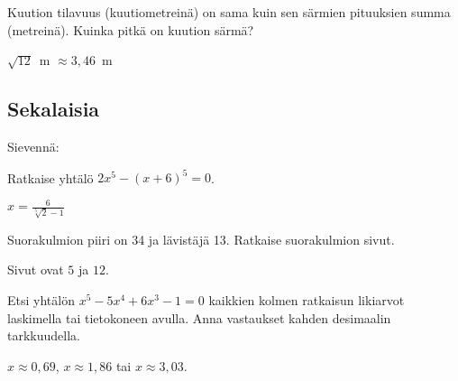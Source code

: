 \begin{tehtavasivu}
\begin{tehtava} 
Kuution tilavuus (kuutiometreinä) on sama kuin sen särmien pituuksien summa (metreinä). Kuinka pitkä on kuution särmä?
    \begin{vastaus}
		$\sqrt{12}$~m $\approx 3,46$~m
    \end{vastaus}
\end{tehtava}

\subsection*{Sekalaisia}

\begin{tehtava} 
Sievennä:
		\begin{alakohdat}
		\end{alakohdat}
	\begin{vastaus}
		\begin{alakohdat}
			\alakohta{$0$}
			\alakohta{$(x-y)^2$}
		\end{alakohdat}
    \end{vastaus}
\end{tehtava}

\begin{tehtava} 
Ratkaise yhtälö
$2x^5-(x+6)^5=0$.
    \begin{vastaus}
	$x=\frac{6}{\sqrt[5]{2}-1}$
    \end{vastaus}
\end{tehtava}

\begin{tehtava} 
Suorakulmion piiri on 34 ja lävistäjä 13. Ratkaise suorakulmion sivut.
    \begin{vastaus}
	Sivut ovat $5$ ja $12$.
    \end{vastaus}
\end{tehtava}

\begin{tehtava} %
Etsi yhtälön $x^5-5x^4+6x^3-1=0$ kaikkien kolmen ratkaisun likiarvot
laskimella tai tietokoneen avulla. Anna vastaukset
kahden desimaalin tarkkuudella.
    \begin{vastaus}
	$x \approx 0,69$, $x \approx 1,86$ tai $x \approx 3,03$.
    \end{vastaus}
\end{tehtava}




\end{tehtavasivu}

